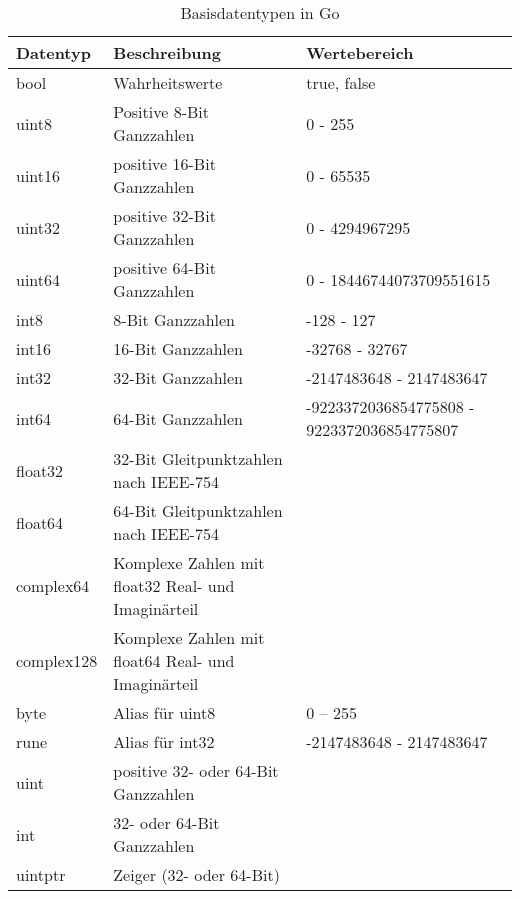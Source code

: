 \begin{table}[H]
    \centering
    \begin{tabularx}{\textwidth}{|l|X|X|}
    \hline 
    \rowcolor[gray]{0.75} \textbf{Datentyp} & \textbf{Beschreibung} & \textbf{Wertebereich} \\
    \hline
    bool & Wahrheitswerte & true, false \\
    \hline
    uint8 & Positive 8-Bit Ganzzahlen & 0 - 255 \\
    \hline
    uint16 & positive 16-Bit Ganzzahlen & 0 - 65535 \\
    \hline
    uint32 & positive 32-Bit Ganzzahlen	& 0 - 4294967295 \\
    \hline
    uint64 & positive 64-Bit Ganzzahlen	& 0 - 18446744073709551615 \\
    \hline
    int8 & 8-Bit Ganzzahlen & -128 - 127 \\
    \hline
    int16 & 16-Bit Ganzzahlen & -32768 - 32767 \\
    \hline
    int32 & 32-Bit Ganzzahlen & -2147483648 - 2147483647 \\
    \hline
    int64 & 64-Bit Ganzzahlen & -9223372036854775808 - 9223372036854775807 \\
    \hline
    float32 & 32-Bit Gleitpunktzahlen nach IEEE-754	& \\
    \hline
    float64 & 64-Bit Gleitpunktzahlen nach IEEE-754	& \\
    \hline
    complex64 & Komplexe Zahlen mit float32 Real- und Imaginärteil & \\
    \hline
    complex128 & Komplexe Zahlen mit float64 Real- und Imaginärteil & \\
    \hline
    byte & Alias für uint8 & 0 – 255 \\
    \hline
    rune & Alias für int32 & -2147483648 - 2147483647 \\
    \hline
    uint & positive 32- oder 64-Bit Ganzzahlen & \\
    \hline
    int & 32- oder 64-Bit Ganzzahlen & \\	
    \hline
    uintptr & Zeiger (32- oder 64-Bit) & \\	
    \hline
    \end{tabularx}
    \caption{Basisdatentypen in Go}
    \label{tab:DatentypenGo}
\end{table}

